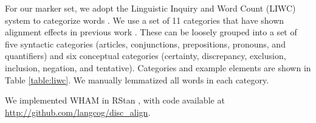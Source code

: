 \documentclass[11pt]{article}
\begin{document}


For our marker set, we adopt the Linguistic Inquiry and Word Count (LIWC) system to categorize words \cite{LIWC}.  We use a set of 11 categories that have shown alignment effects in previous work \cite{DNMGamonDumais2011}. These can be loosely grouped into a set of five syntactic categories (articles, conjunctions, prepositions, pronouns, and quantifiers) and six conceptual categories (certainty, discrepancy, exclusion, inclusion, negation, and tentative). Categories and example elements are shown in Table \ref{table:liwc}. We manually lemmatized all words in each category.

We implemented WHAM in RStan \cite{Stan}, with code available at \url{http://github.com/langcog/disc_align}.
\end{document}
